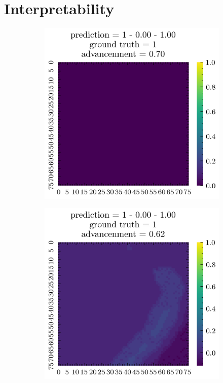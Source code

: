 \documentclass[../document.tex]{subfiles}
\begin{document}
\section{Interpretability}
\begin{figure}[H]
    \centering
    \begin{subfigure}[b]{0.19\textwidth}
        \includegraphics[width=\linewidth]{../img/5/quarry/best/patch-2d-0.png}
    \end{subfigure}
    \begin{subfigure}[b]{0.19\textwidth}
        \includegraphics[width=\linewidth]{../img/5/quarry/best/patch-2d-1.png}

\end{subfigure}
\end{figure}
\end{document}
